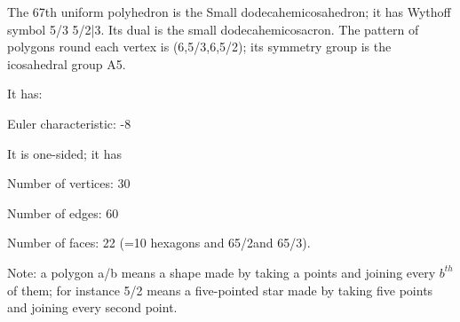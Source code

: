 The 67th uniform polyhedron is the Small dodecahemicosahedron; it has Wythoff symbol 5/3 5/2|3. Its dual is the small dodecahemicosacron. The pattern of polygons round each vertex is (6,5/3,6,5/2); its symmetry group is the icosahedral group A5.\par
It has:\par
Euler characteristic: -8\par
It is one-sided; it has\par
Number of vertices: 30\par
Number of edges:  60\par
Number of faces: 22 (=10 hexagons and 6{5/2}and 6{5/3}).\par
Note: a polygon a/b means a shape made by taking a points and joining every $b^{th}$  of them; for instance 5/2 means a five-pointed star made by taking five points and joining every second point.
